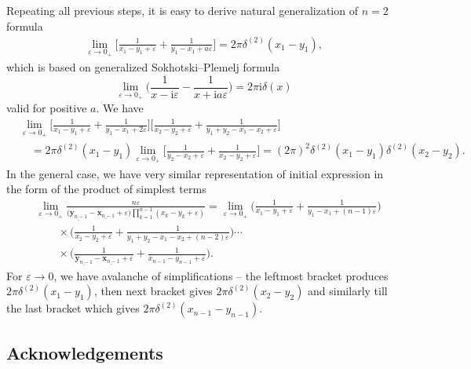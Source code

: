\documentclass[pdftex]{sigma}
\renewcommand{\imath}{\mathrm{i}}
\numberwithin{equation}{section}
\begin{document}
Repeating all previous steps, it is easy to derive natural
generalization of $n=2$ formula
\begin{align*}
\lim\limits_{\varepsilon\to 0_+}
\biggl[
\frac{1}
{x_1-y_1+\varepsilon}+
\frac{1}
{y_1-x_1+a\varepsilon}\biggr] = 2\pi \delta^{(2)}(x_1-y_1),
\end{align*}
which is based on generalized Sokhotski–Plemelj formula
\begin{equation*}
	\lim\limits_{\varepsilon\to 0_+}
	\biggl(\frac{1}{x -\imath\varepsilon}
	- \frac{1}{x +\imath a \varepsilon}\biggr)
	= 2\pi\imath \delta(x)
\end{equation*}
valid for positive $a$.
We have
\begin{align*}
&
\lim\limits_{\varepsilon\to 0_+}
\biggl[
\frac{1}
{x_1-y_1+\varepsilon}+
\frac{1}
{y_1-x_1+2\varepsilon}\biggr]
\biggl[\frac{1}{x_2-y_2+\varepsilon}+
\frac{1}{y_1+y_2-x_1-x_2+\varepsilon}
\biggr] \\
& \quad =
2\pi \delta^{(2)}(x_1-y_1)
\lim\limits_{\varepsilon\to 0_+}
\biggl[
\frac{1}{y_2-x_2+\varepsilon}+\frac{1}{x_2-y_2+\varepsilon}
\biggr] = (2\pi)^2 \delta^{(2)}(x_1-y_1) \delta^{(2)}(x_2-y_2) .
\end{align*}
In the general case, we have very similar representation
of initial expression in the form of the product of simplest terms
\begin{align*}
&
\lim\limits_{\varepsilon\to 0_+}
\frac{n \varepsilon}
{\bigl(\underline{\bm{y}_{n-1}}-\underline{\bm{x}_{n-1}}+\varepsilon\bigr)
\prod_{k=1}^{n-1}(x_k-y_k+\varepsilon)} = \lim\limits_{\varepsilon\to 0_+}
\biggl(\frac{1}
{x_1-y_1+\varepsilon}+
\frac{1}
{y_1-x_1+(n-1)\varepsilon}\biggr) \\
&\qquad{} \times \biggl(\frac{1}{x_2-y_2+\varepsilon}+
\frac{1}{y_1+y_2-x_1-x_2+(n-2)\varepsilon}
\biggr)
\cdots \\
&\qquad{} \times
\biggl(\frac{1}{\underline{\bm{y}_{n-1}}-\underline{\bm{x}_{n-1}}+\varepsilon}+
\frac{1}{x_{n-1}-y_{n-1}+\varepsilon}\biggr).
\end{align*}
For $\varepsilon \to 0$, we have avalanche of simplifications --
the leftmost bracket produces $2\pi \delta^{(2)}(x_1-y_1)$,
then next bracket gives $2\pi \delta^{(2)}(x_2-y_2)$ and similarly till the last bracket which gives $2\pi \delta^{(2)}(x_{n-1}-y_{n-1})$.

\subsection*{Acknowledgements}
\end{document}
